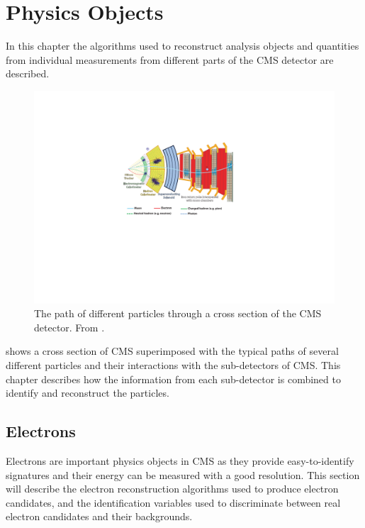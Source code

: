 \chapter{Physics Objects}
\label{chap:objects}

In this chapter the algorithms used to reconstruct analysis objects and
quantities from individual measurements from different parts of the CMS detector
are described.

\begin{figure}[htbp]
  \centering
  \includegraphics[trim=8cm 8cm 9cm 5cm, width=\textwidth]{slice}
  \caption{The path of different particles through a cross section of the CMS
detector. From \cite{cmsslice}.}
  \label{reco:crosssec}
\end{figure}

 shows a cross section of {CMS} superimposed with the
typical paths of several different particles and their interactions with the
sub-detectors of {CMS}.  This chapter describes how the information
from each sub-detector is combined to identify and reconstruct the particles.

\section{Electrons}
Electrons are important physics objects in CMS as they provide easy-to-identify
signatures and their energy can be measured with a good resolution. This section
will describe the electron reconstruction algorithms used to produce electron
candidates, and the identification variables used to discriminate between real
electron candidates and their backgrounds.

